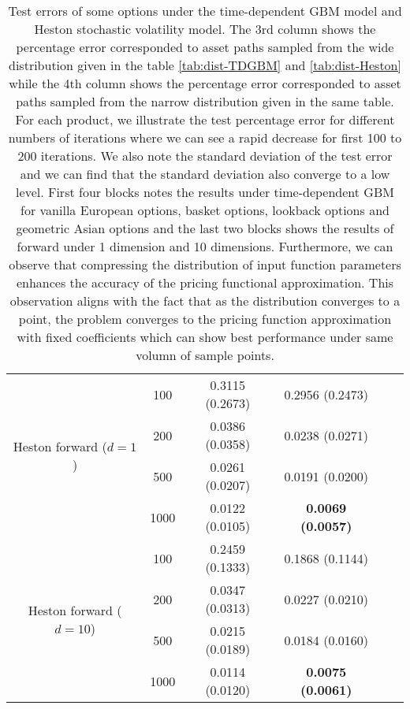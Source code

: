 \documentclass[11pt,a4paper]{article}
\theoremstyle{remark}
\begin{document}
\begin{table}[htbp!]
\begin{tabular}{cccccc}
		\hline \multirow{4}{*}{Heston forward ($d=1$)} & 100 & 0.3115 (0.2673) & 0.2956 (0.2473) \\
		& 200 & 0.0386 (0.0358) & 0.0238 (0.0271) \\
		& 500 & 0.0261 (0.0207) & 0.0191 (0.0200) \\
		& 1000 & 0.0122 (0.0105) & \textbf{0.0069 (0.0057)} \\
		\hline \multirow{4}{*}{Heston forward ($d=10$)} & 100 & 0.2459 (0.1333) & 0.1868 (0.1144) \\
		& 200 & 0.0347 (0.0313) & 0.0227 (0.0210) \\
		& 500 & 0.0215 (0.0189) & 0.0184 (0.0160) \\
		& 1000 & 0.0114 (0.0120) & \textbf{0.0075 (0.0061)} \\
		\hline
		
	
	\end{tabular}
	\caption{Test errors of some options under the time-dependent GBM model and Heston stochastic volatility model. The 3rd column shows the percentage error corresponded to asset paths sampled from the wide distribution given in the table \ref{tab:dist-TDGBM} and \ref{tab:dist-Heston} while the 4th column shows the percentage error corresponded to asset paths sampled from the narrow distribution given in the same table. For each product, we illustrate the test percentage error for different numbers of iterations where we can see a rapid decrease for first 100 to 200 iterations. We also note the standard deviation of the test error and we can find that the standard deviation also converge to a low level. First four blocks notes the results under time-dependent GBM for vanilla European options, basket options, lookback options and geometric Asian options and the last two blocks shows the results of forward under 1 dimension and 10 dimensions. Furthermore, we can observe that compressing the distribution of input function parameters enhances the accuracy of the pricing functional approximation. This observation aligns with the fact that as the distribution converges to a point, the problem converges to the pricing function approximation with fixed coefficients which can show best performance under same volumn of sample points.}
	\label{tab:test-GBM&SV}
\end{table}
\fi
\end{document}
